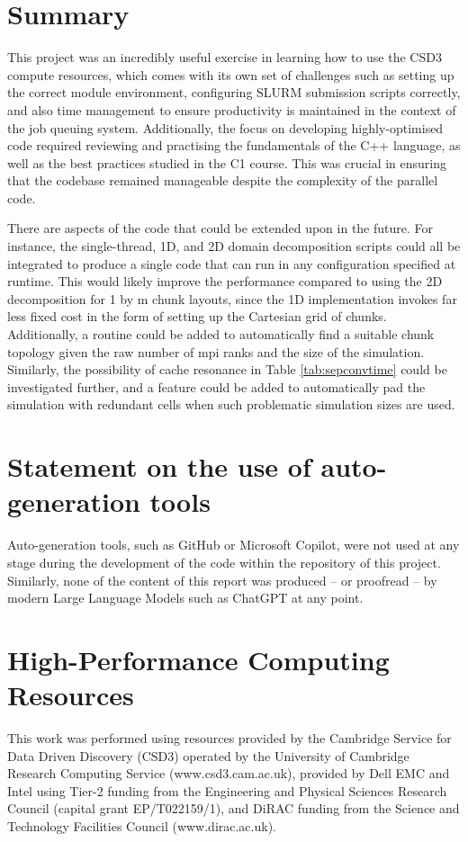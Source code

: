 \documentclass[12pt]{article}
\begin{document}
\section{Summary}

This project was an incredibly useful exercise in learning how to use the CSD3 compute resources,
which comes with its own set of challenges such as setting up the correct module environment,
configuring SLURM submission scripts correctly,
and also time management to ensure productivity is maintained in the context of the job queuing system.
Additionally, the focus on developing highly-optimised code required reviewing and practising the fundamentals of the C++ language,
as well as the best practices studied in the C1 course.
This was crucial in ensuring that the codebase remained manageable despite the complexity of the parallel code.

There are aspects of the code that could be extended upon in the future.
For instance, the single-thread, 1D, and 2D domain decomposition scripts could all be integrated to produce a single code that can run in any configuration specified at runtime.
This would likely improve the performance compared to using the 2D decomposition for 1 by m chunk layouts,
since the 1D implementation invokes far less fixed cost in the form of setting up the Cartesian grid of chunks.
Additionally, a routine could be added to automatically find a suitable chunk topology given the raw number of mpi ranks and the size of the simulation.
Similarly, the possibility of cache resonance in Table \ref{tab:sepconvtime} could be investigated further,
and a feature could be added to automatically pad the simulation with redundant cells when such problematic simulation sizes are used.




\appendix

\section{Statement on the use of auto-generation tools}

Auto-generation tools, such as GitHub or Microsoft Copilot, were not used at any stage during the development of the code within the repository of this project.
Similarly, none of the content of this report was produced -- or proofread -- by modern Large Language Models such as ChatGPT at any point.

\section {High-Performance Computing Resources}

This work was performed using resources provided by the Cambridge Service for Data Driven Discovery (CSD3) operated by the University of Cambridge Research Computing Service (www.csd3.cam.ac.uk),
provided by Dell EMC and Intel using Tier-2 funding from the Engineering and Physical Sciences Research Council (capital grant EP/T022159/1),
and DiRAC funding from the Science and Technology Facilities Council (www.dirac.ac.uk).
\end{document}
